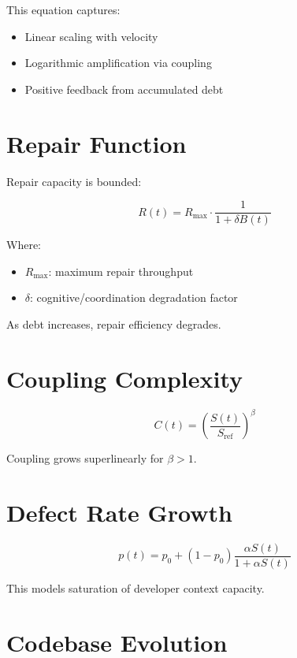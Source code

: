 \documentclass[11pt]{article}
\begin{document}
This equation captures:
\begin{itemize}
    \item Linear scaling with velocity
    \item Logarithmic amplification via coupling
    \item Positive feedback from accumulated debt
\end{itemize}

\section{Repair Function}

Repair capacity is bounded:

\begin{equation}
R(t) = R_{\max} \cdot \frac{1}{1 + \delta B(t)}
\end{equation}

Where:
\begin{itemize}
    \item $R_{\max}$: maximum repair throughput
    \item $\delta$: cognitive/coordination degradation factor
\end{itemize}

As debt increases, repair efficiency degrades.

\section{Coupling Complexity}

\begin{equation}
C(t) = \left(\frac{S(t)}{S_{\text{ref}}}\right)^{\beta}
\end{equation}

Coupling grows superlinearly for $\beta > 1$.

\section{Defect Rate Growth}

\begin{equation}
p(t) = p_0 + (1 - p_0)\frac{\alpha S(t)}{1 + \alpha S(t)}
\end{equation}

This models saturation of developer context capacity.

\section{Codebase Evolution}
\end{document}

